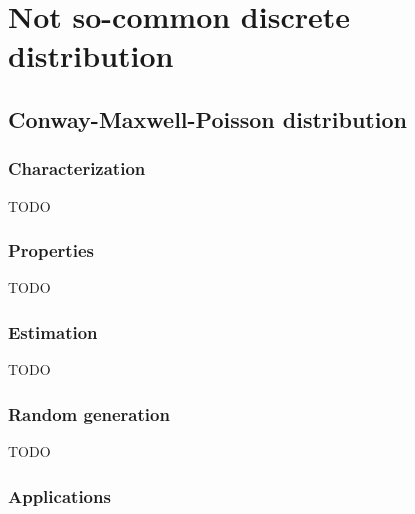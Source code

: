 % 	
%
%
%


\chapter{Not so-common discrete distribution}
\section{Conway-Maxwell-Poisson distribution}
\subsection{Characterization}
TODO
\subsection{Properties}
TODO
\subsection{Estimation}
TODO
\subsection{Random generation}
TODO
\subsection{Applications}

